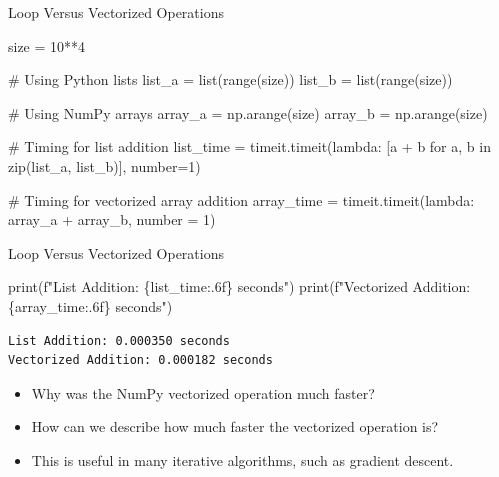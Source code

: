 \documentclass[
  ignorenonframetext,
]{beamer}
\newenvironment{Shaded}{\begin{snugshade}}{\end{snugshade}}
\newcommand{\BuiltInTok}[1]{\textcolor[rgb]{0.00,0.23,0.31}{#1}}
\newcommand{\CommentTok}[1]{\textcolor[rgb]{0.37,0.37,0.37}{#1}}
\newcommand{\ControlFlowTok}[1]{\textcolor[rgb]{0.00,0.23,0.31}{#1}}
\newcommand{\DecValTok}[1]{\textcolor[rgb]{0.68,0.00,0.00}{#1}}
\newcommand{\KeywordTok}[1]{\textcolor[rgb]{0.00,0.23,0.31}{#1}}
\newcommand{\NormalTok}[1]{\textcolor[rgb]{0.00,0.23,0.31}{#1}}
\newcommand{\OperatorTok}[1]{\textcolor[rgb]{0.37,0.37,0.37}{#1}}
\newcommand{\SpecialCharTok}[1]{\textcolor[rgb]{0.37,0.37,0.37}{#1}}
\newcommand{\SpecialStringTok}[1]{\textcolor[rgb]{0.13,0.47,0.30}{#1}}
\begin{document}
\begin{frame}[fragile]{Loop Versus Vectorized Operations}
\protect\hypertarget{loop-versus-vectorized-operations}{}
\begin{Shaded}
\begin{Highlighting}[]
\NormalTok{size }\OperatorTok{=} \DecValTok{10}\OperatorTok{**}\DecValTok{4}

\CommentTok{\# Using Python lists}
\NormalTok{list\_a }\OperatorTok{=} \BuiltInTok{list}\NormalTok{(}\BuiltInTok{range}\NormalTok{(size))}
\NormalTok{list\_b }\OperatorTok{=} \BuiltInTok{list}\NormalTok{(}\BuiltInTok{range}\NormalTok{(size))}

\CommentTok{\# Using NumPy arrays}
\NormalTok{array\_a }\OperatorTok{=}\NormalTok{ np.arange(size)}
\NormalTok{array\_b }\OperatorTok{=}\NormalTok{ np.arange(size)}

\CommentTok{\# Timing for list addition}
\NormalTok{list\_time }\OperatorTok{=}\NormalTok{ timeit.timeit(}\KeywordTok{lambda}\NormalTok{: }
\NormalTok{  [a }\OperatorTok{+}\NormalTok{ b }\ControlFlowTok{for}\NormalTok{ a, b }\KeywordTok{in} \BuiltInTok{zip}\NormalTok{(list\_a, list\_b)], number}\OperatorTok{=}\DecValTok{1}\NormalTok{)}

\CommentTok{\# Timing for vectorized array addition}
\NormalTok{array\_time }\OperatorTok{=}\NormalTok{ timeit.timeit(}\KeywordTok{lambda}\NormalTok{: }
\NormalTok{  array\_a }\OperatorTok{+}\NormalTok{ array\_b, number }\OperatorTok{=} \DecValTok{1}\NormalTok{)}
\end{Highlighting}
\end{Shaded}
\end{frame}

\begin{frame}[fragile]{Loop Versus Vectorized Operations}
\protect\hypertarget{loop-versus-vectorized-operations-1}{}
\begin{Shaded}
\begin{Highlighting}[]
\BuiltInTok{print}\NormalTok{(}\SpecialStringTok{f"List Addition: }\SpecialCharTok{\{}\NormalTok{list\_time}\SpecialCharTok{:.6f\}}\SpecialStringTok{ seconds"}\NormalTok{)}
\BuiltInTok{print}\NormalTok{(}\SpecialStringTok{f"Vectorized Addition: }\SpecialCharTok{\{}\NormalTok{array\_time}\SpecialCharTok{:.6f\}}\SpecialStringTok{ seconds"}\NormalTok{)}
\end{Highlighting}
\end{Shaded}

\begin{verbatim}
List Addition: 0.000350 seconds
Vectorized Addition: 0.000182 seconds
\end{verbatim}

\begin{itemize}
\item
  Why was the NumPy vectorized operation much faster?
\item
  How can we describe how much faster the vectorized operation is?
\item
  This is useful in many iterative algorithms, such as gradient descent.
\end{itemize}
\end{frame}
\end{document}
